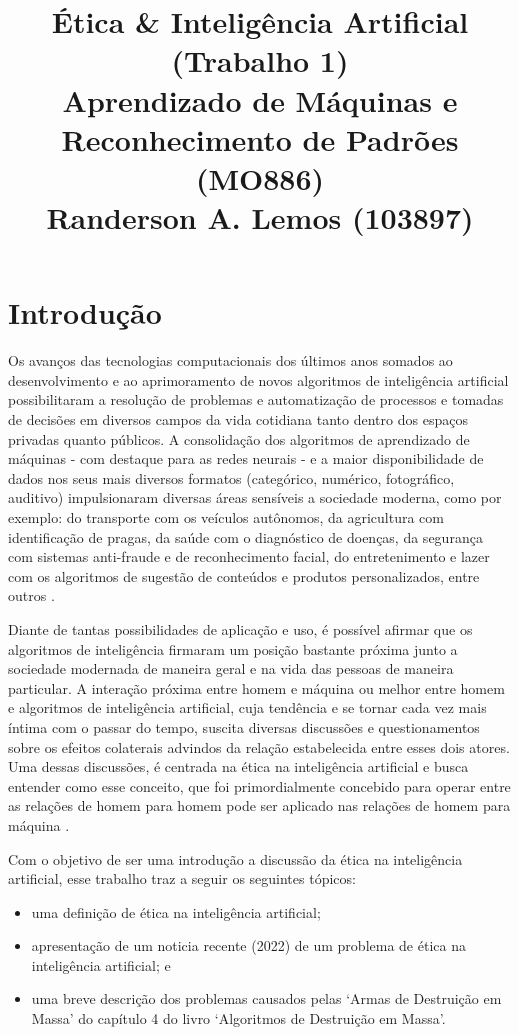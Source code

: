 \documentclass{article}
\title{
	Ética \& Inteligência Artificial (Trabalho 1) \\
	\Large Aprendizado de Máquinas e Reconhecimento de Padrões (MO886) \\
	Randerson A. Lemos (103897)
}
\date{\vspace{-5ex}}
\begin{document}
  \maketitle

%
\section*{Introdução}

Os avanços das tecnologias computacionais dos últimos anos somados ao desenvolvimento e ao aprimoramento de novos algoritmos de inteligência artificial possibilitaram a resolução de problemas e automatização de processos e tomadas de decisões em diversos campos da vida cotidiana tanto dentro dos espaços privadas quanto públicos. A consolidação dos algoritmos de aprendizado de máquinas - com destaque para as redes neurais - e a maior disponibilidade de dados nos seus mais diversos formatos (categórico, numérico, fotográfico, auditivo) impulsionaram diversas áreas sensíveis a sociedade moderna, como por exemplo: do transporte com os veículos autônomos, da agricultura com identificação de pragas, da saúde com o diagnóstico de doenças, da segurança com sistemas anti-fraude e de reconhecimento facial, do entretenimento e lazer com os algoritmos de sugestão de conteúdos e produtos personalizados, entre outros \cite{Ludermir_2021}.

Diante de tantas possibilidades de aplicação e uso, é possível afirmar que os algoritmos de inteligência firmaram um posição bastante próxima junto a sociedade modernada de maneira geral e na vida das pessoas de maneira particular. A interação próxima entre homem e máquina ou melhor entre homem e algoritmos de inteligência artificial, cuja tendência e se tornar cada vez mais íntima com o passar do tempo, suscita diversas discussões e questionamentos sobre os efeitos colaterais advindos da relação estabelecida entre esses dois atores. Uma dessas discussões, é centrada na ética na inteligência artificial e busca entender como esse conceito, que foi primordialmente concebido para operar entre as relações de homem para homem pode ser aplicado nas relações de homem para máquina \cite{Ludermir_2021}. 

Com o objetivo de ser uma introdução a discussão da ética na inteligência artificial, esse trabalho traz a seguir os seguintes tópicos:
\begin{itemize}
	\item uma definição de ética na inteligência artificial;
	\item apresentação de um noticia recente (2022) de um problema de ética na inteligência artificial; e
	\item uma breve descrição dos problemas causados pelas `Armas de Destruição em Massa' do capítulo 4 do livro `Algoritmos de Destruição em Massa'.
\end{itemize}
\end{document}
